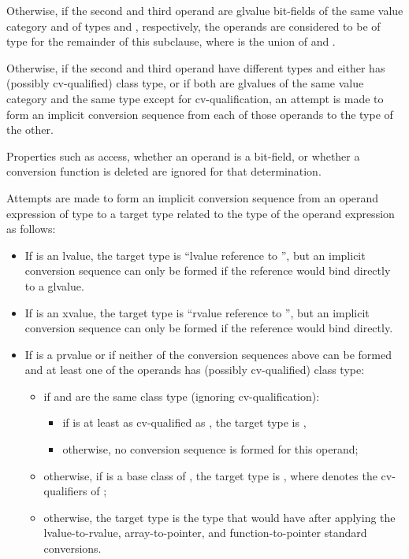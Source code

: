 \pnum
Otherwise, if the second and third operand are glvalue bit-fields
of the same value category and
of types   and  , respectively,
the operands are considered to be of type \cv{} 
for the remainder of this subclause,
where \cv{} is the union of  and .

\pnum
Otherwise, if the second and third operand have different types and
either has (possibly cv-qualified) class type, or if both
are glvalues of the same value category and the same type except for
cv-qualification, an attempt is made to
form an implicit conversion sequence from
each of those operands to the type of the other.
\begin{note}
Properties such as access, whether an operand is a bit-field, or whether
a conversion function is deleted are ignored for that determination.
\end{note}
Attempts are made to form an implicit conversion sequence
from an operand expression  of type 
to a target type related to the type 
of the operand expression  as follows:

\begin{itemize}
\item If  is an lvalue, the target type is
``lvalue reference to '',
but an implicit conversion sequence can only be formed
if the reference would bind directly
to a glvalue.

\item If  is an xvalue, the target type is
``rvalue reference to '',
but an implicit conversion sequence can only be formed
if the reference would bind directly.

\item If  is a prvalue or if neither of the conversion sequences above can be
formed and at least one of the operands has (possibly cv-qualified) class type:
\begin{itemize}
\item if  and  are the same class type
(ignoring cv-qualification):
  \begin{itemize}
  \item
  if  is at least as cv-qualified as ,
  the target type is ,
  \item
  otherwise, no conversion sequence is formed for this operand;
  \end{itemize}

\item otherwise, if  is a base class of ,
the target type is  , where 
denotes the cv-qualifiers of ;

\item otherwise, the target type is the type that  would have
after applying the
lvalue-to-rvalue,
array-to-pointer, and
function-to-pointer
standard conversions.
\end{itemize}
\end{itemize}


